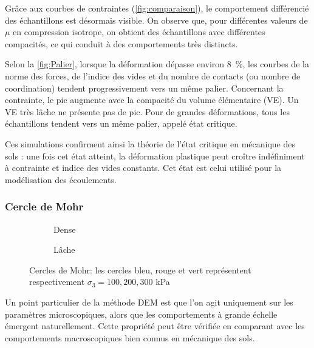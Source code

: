\documentclass[a4paper,12pt]{report}
\begin{document}
Grâce aux courbes de contraintes (\autoref{fig:comparaison}), le comportement différencié des échantillons est désormais visible.  
On observe que, pour différentes valeurs de $\mu$ en compression isotrope, on obtient des échantillons avec différentes compacités, ce qui conduit à des comportements très distincts.  

Selon la \autoref{fig:Palier}, lorsque la déformation dépasse environ 8~\%, les courbes de la norme des forces, de l’indice des vides et du nombre de contacts (ou nombre de coordination) tendent progressivement vers un même palier.  
Concernant la contrainte, le pic augmente avec la compacité du volume élémentaire (VE). Un VE très lâche ne présente pas de pic. Pour de grandes déformations, tous les échantillons tendent vers un même palier, appelé état critique.  

Ces simulations confirment ainsi la théorie de l’état critique en mécanique des sols : une fois cet état atteint, la déformation plastique peut croître indéfiniment à contrainte et indice des vides constants.  
Cet état est celui utilisé pour la modélisation des écoulements.

\subsubsection{Cercle de Mohr}

\begin{figure}[h!]
    \centering
    \begin{subfigure}[b]{0.48\textwidth}
        \centering
        \scalebox{0.6}{\small }
        \caption{Dense}
        \label{fig:cercle_dense}
    \end{subfigure}
    \hfill
    \begin{subfigure}[b]{0.48\textwidth}
        \centering
        \scalebox{0.65}{\small }
        \caption{Lâche}
        \label{fig:cercle_lache}
    \end{subfigure}
    \caption{Cercles de Mohr: les cercles bleu, rouge et vert représentent respectivement $\sigma_3 = 100, 200, 300$ kPa}
    \label{fig:CercleDuMohr}
\end{figure}

Un point particulier de la méthode DEM est que l’on agit uniquement sur les paramètres microscopiques, alors que les comportements à grande échelle émergent naturellement.  
Cette propriété peut être vérifiée en comparant avec les comportements macroscopiques bien connus en mécanique des sols.  
\end{document}
